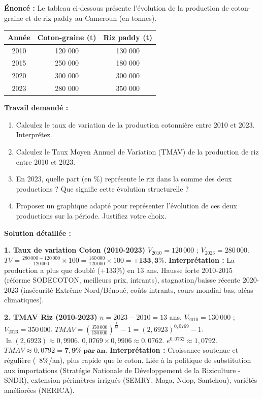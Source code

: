 \documentclass[11pt]{article}
\begin{document}
\begin{exoresolu}
\textbf{Énoncé :} Le tableau ci-dessous présente l'évolution de la production de coton-graine et de riz paddy au Cameroun (en tonnes).
\begin{center}
\begin{tabular}{|c|c|c|}\hline
\textbf{Année} & \textbf{Coton-graine (t)} & \textbf{Riz paddy (t)} \\ \hline
2010 & 120 000 & 130 000 \\ \hline
2015 & 250 000 & 180 000 \\ \hline
2020 & 300 000 & 300 000 \\ \hline
2023 & 280 000 & 350 000 \\ \hline
\end{tabular}
\end{center}
\textbf{Travail demandé :}
\begin{enumerate}
    \item Calculez le taux de variation de la production cotonnière entre 2010 et 2023. Interprétez.
    \item Calculez le Taux Moyen Annuel de Variation (TMAV) de la production de riz entre 2010 et 2023.
    \item En 2023, quelle part (en \%) représente le riz dans la somme des deux productions ? Que signifie cette évolution structurelle ?
    \item Proposez un graphique adapté pour représenter l'évolution de ces deux productions sur la période. Justifiez votre choix.
\end{enumerate}
\tcblower
\textbf{Solution détaillée :}

\textbf{1. Taux de variation Coton (2010-2023)}
$V_{2010} = 120\,000$ ; $V_{2023} = 280\,000$.
$TV = \frac{280\,000 - 120\,000}{120\,000} \times 100 = \frac{160\,000}{120\,000} \times 100 = \mathbf{+133,3\%}$.
\textbf{Interprétation :} La production a plus que doublé (+133\%) en 13 ans. Hausse forte 2010-2015 (réforme SODECOTON, meilleurs prix, intrants), stagnation/baisse récente 2020-2023 (insécurité Extrême-Nord/Bénoué, coûts intrants, cours mondial bas, aléas climatiques).

\textbf{2. TMAV Riz (2010-2023)}
$n = 2023 - 2010 = 13$ ans.
$V_{2010} = 130\,000$ ; $V_{2023} = 350\,000$.
$TMAV = \left( \frac{350\,000}{130\,000} \right)^{\frac{1}{13}} - 1 = (2,6923)^{0,0769} - 1$.
$\ln(2,6923) \approx 0,9906$.
$0,0769 \times 0,9906 \approx 0,0762$.
$e^{0,0762} \approx 1,0792$.
$TMAV \approx 0,0792 = \mathbf{7,9\%\ par\ an}$.
\textbf{Interprétation :} Croissance soutenue et régulière (~8\%/an), plus rapide que le coton. Liée à la politique de substitution aux importations (Stratégie Nationale de Développement de la Riziculture - SNDR), extension périmètres irrigués (SEMRY, Maga, Ndop, Santchou), variétés améliorées (NERICA).


\end{exoresolu}
\end{document}

